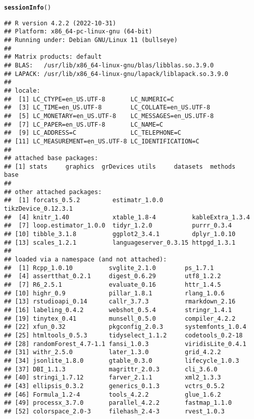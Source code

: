 \documentclass[12pt]{article}\usepackage[]{graphicx}\usepackage[]{xcolor}
\makeatletter
\newcommand{\hlstd}[1]{\textcolor[rgb]{0.345,0.345,0.345}{#1}}%
\newcommand{\hlkwd}[1]{\textcolor[rgb]{0.737,0.353,0.396}{\textbf{#1}}}%
\newenvironment{kframe}{%
 \def\at@end@of@kframe{}%
 \ifinner\ifhmode%
  \def\at@end@of@kframe{\end{minipage}}%
  \begin{minipage}{\columnwidth}%
 \fi\fi%
 \def\FrameCommand##1{\hskip\@totalleftmargin \hskip-\fboxsep
 \colorbox{shadecolor}{##1}\hskip-\fboxsep
     \hskip-\linewidth \hskip-\@totalleftmargin \hskip\columnwidth}%
 \MakeFramed {\advance\hsize-\width
   \@totalleftmargin\z@ \linewidth\hsize
   \@setminipage}}%
 {\par\unskip\endMakeFramed%
 \at@end@of@kframe}
\newenvironment{knitrout}{}{} %
\makeatother
\begin{document}
\begin{knitrout}
\color{fgcolor}\begin{kframe}
\begin{alltt}
\hlkwd{sessionInfo}\hlstd{()}
\end{alltt}
\begin{verbatim}
## R version 4.2.2 (2022-10-31)
## Platform: x86_64-pc-linux-gnu (64-bit)
## Running under: Debian GNU/Linux 11 (bullseye)
## 
## Matrix products: default
## BLAS:   /usr/lib/x86_64-linux-gnu/blas/libblas.so.3.9.0
## LAPACK: /usr/lib/x86_64-linux-gnu/lapack/liblapack.so.3.9.0
## 
## locale:
##  [1] LC_CTYPE=en_US.UTF-8       LC_NUMERIC=C              
##  [3] LC_TIME=en_US.UTF-8        LC_COLLATE=en_US.UTF-8    
##  [5] LC_MONETARY=en_US.UTF-8    LC_MESSAGES=en_US.UTF-8   
##  [7] LC_PAPER=en_US.UTF-8       LC_NAME=C                 
##  [9] LC_ADDRESS=C               LC_TELEPHONE=C            
## [11] LC_MEASUREMENT=en_US.UTF-8 LC_IDENTIFICATION=C       
## 
## attached base packages:
## [1] stats     graphics  grDevices utils     datasets  methods   base     
## 
## other attached packages:
##  [1] forcats_0.5.2         estimatr_1.0.0        tikzDevice_0.12.3.1  
##  [4] knitr_1.40            xtable_1.8-4          kableExtra_1.3.4     
##  [7] loop.estimator_1.0.0  tidyr_1.2.0           purrr_0.3.4          
## [10] tibble_3.1.8          ggplot2_3.4.1         dplyr_1.0.10         
## [13] scales_1.2.1          languageserver_0.3.15 httpgd_1.3.1         
## 
## loaded via a namespace (and not attached):
##  [1] Rcpp_1.0.10          svglite_2.1.0        ps_1.7.1            
##  [4] assertthat_0.2.1     digest_0.6.29        utf8_1.2.2          
##  [7] R6_2.5.1             evaluate_0.16        httr_1.4.5          
## [10] highr_0.9            pillar_1.8.1         rlang_1.0.6         
## [13] rstudioapi_0.14      callr_3.7.3          rmarkdown_2.16      
## [16] labeling_0.4.2       webshot_0.5.4        stringr_1.4.1       
## [19] tinytex_0.41         munsell_0.5.0        compiler_4.2.2      
## [22] xfun_0.32            pkgconfig_2.0.3      systemfonts_1.0.4   
## [25] htmltools_0.5.3      tidyselect_1.1.2     codetools_0.2-18    
## [28] randomForest_4.7-1.1 fansi_1.0.3          viridisLite_0.4.1   
## [31] withr_2.5.0          later_1.3.0          grid_4.2.2          
## [34] jsonlite_1.8.0       gtable_0.3.0         lifecycle_1.0.3     
## [37] DBI_1.1.3            magrittr_2.0.3       cli_3.6.0           
## [40] stringi_1.7.12       farver_2.1.1         xml2_1.3.3          
## [43] ellipsis_0.3.2       generics_0.1.3       vctrs_0.5.2         
## [46] Formula_1.2-4        tools_4.2.2          glue_1.6.2          
## [49] processx_3.7.0       parallel_4.2.2       fastmap_1.1.0       
## [52] colorspace_2.0-3     filehash_2.4-3       rvest_1.0.3
\end{verbatim}
\end{kframe}
\end{knitrout}
\end{document}
